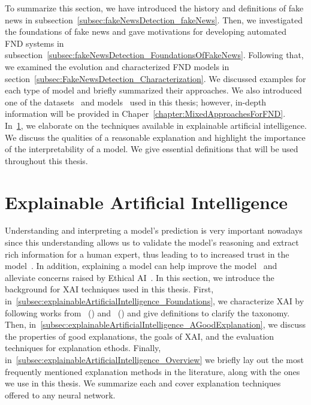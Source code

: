 To summarize this section, we have introduced the history and definitions of fake news in subsection~\ref{subsec:fakeNewsDetection_fakeNews}. Then, we investigated the foundations of fake news and gave motivations for developing automated FND systems in subsection~\ref{subsec:fakeNewsDetection_FoundationsOfFakeNews}. Following that, we examined the evolution and characterized FND models in section~\ref{subsec:FakeNewsDetection_Characterization}. We discussed examples for each type of model and briefly summarized their approaches. We also introduced one of the datasets~\parencite{UPFD_Dataset_Shu} and models~\parencite{GraphSAGE_Hamilton} used in this thesis; however, in-depth information will be provided in Chaper~\ref{chapter:MixedApproachesForFND}.\\
In~\ref{sec:explainableArtificialIntelligence}, we elaborate on the techniques available in explainable artificial intelligence. We discuss the qualities of a reasonable explanation and highlight the importance of the interpretability of a model. We give essential definitions that will be used throughout this thesis.

\section{Explainable Artificial Intelligence}
\label{sec:explainableArtificialIntelligence}
Understanding and interpreting a model's prediction is very important nowadays since this understanding allows us to validate the model's reasoning and extract rich information for a human expert, thus leading to to increased trust in the model~\parencite{WhyShouldITrustYou_Riberio}. In addition, explaining a model can help improve the model~\parencite{AUnifiedApproach_Lundberg} and alleviate concerns raised by Ethical AI~\parencite{MachineBias_Angwin, EURegulationsOnDecisionMaking_Goodman}.
In this section, we introduce the background for XAI techniques used in this thesis. First, in~\ref{subsec:explainableArtificialIntelligence_Foundations}, we characterize XAI by following works from~\citeauthor{TheMythosOfModelInterpretability_Lipton} (\citeyear{TheMythosOfModelInterpretability_Lipton}) and~\citeauthor{XAIConceptsTaxonomies_Arrieta} (\citeyear{XAIConceptsTaxonomies_Arrieta}) and give definitions to clarify the taxonomy. Then, in~\ref{subsec:explainableArtificialIntelligence_AGoodExplanation}, we discuss the properties of good explanations, the goals of XAI, and the evaluation techniques for explanation ethods. Finally, in~\ref{subsec:explainableArtificialIntelligence_Overview} we briefly lay out the most frequently mentioned explanation methods in the literature, along with the ones we use in this thesis. We summarize each and cover explanation techniques offered to any  neural network.

